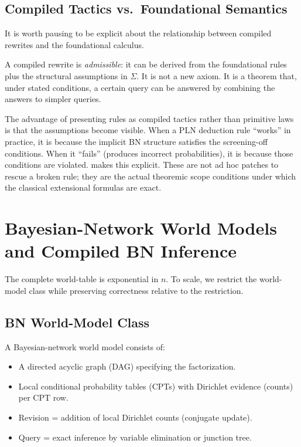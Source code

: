 \documentclass[11pt,openany]{report}
\begin{document}
\section{Compiled Tactics vs.\ Foundational Semantics}

It is worth pausing to be explicit about the relationship between compiled
rewrites and the foundational calculus.

A compiled rewrite is \emph{admissible}: it can be derived from the
foundational rules plus the structural assumptions in $\Sigma$.  It is
not a new axiom.  It is a theorem that, under stated conditions, a certain
query can be answered by combining the answers to simpler queries.

The advantage of presenting rules as compiled tactics rather than primitive
laws is that the assumptions become visible.  When a PLN deduction rule
``works'' in practice, it is because the implicit BN structure satisfies
the screening-off conditions.  When it ``fails'' (produces incorrect
probabilities), it is because those conditions are violated.  \xiPLN{}
makes this explicit.  These are not ad hoc patches to rescue a broken
rule; they are the actual theoremic scope conditions under which the
classical extensional formulas are exact.


\chapter{Bayesian-Network World Models and Compiled BN Inference}
\label{ch:bn-models}

The complete world-table \JointEvidence{} is exponential in $n$.  To scale,
we restrict the world-model class while preserving correctness relative
to the restriction.

\section{BN World-Model Class}

A Bayesian-network world model consists of:
\begin{itemize}
\item A directed acyclic graph (DAG) specifying the factorization.
\item Local conditional probability tables (CPTs) with Dirichlet evidence
  (counts) per CPT row.
\item Revision = addition of local Dirichlet counts (conjugate update).
\item Query = exact inference by variable elimination or junction tree.
\end{itemize}
\end{document}
